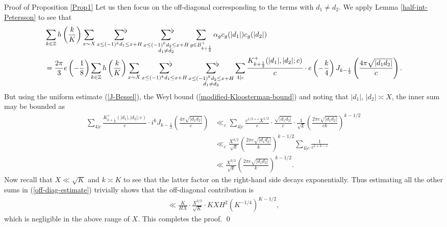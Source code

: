 \documentclass[a4paper,10pt,twoside]{amsart}
\theoremstyle{definition}
\numberwithin{equation}{section}
\newcommand\eps{\varepsilon}
\renewcommand\:{\colon}
\newcommand{\sumflat}{\mathop{{\sum}^{\raisebox{-3pt}{\makebox[0pt][l]{$\flat$}}}}}
\begin{document}
\begin{subsection}{Proof of Proposition \ref{Prop1}}
Let us then focus on the off-diagonal corresponding to the terms with $d_1\neq d_2$. We apply Lemma \ref{half-int-Petersson} to see that 
\begin{align}\label{off-diag-estimate}
&\sum_{k\in\mathbb Z}h\left(\frac{k}K\right)\sum_{x\sim X}\sumflat_{x\leq(-1)^kd_1\leq x+H}\sumflat_{\substack{x\leq(-1)^kd_2\leq x+H\\
d_1\neq d_2}}\sum_{g\in B^+_{k+\frac12}}\alpha_g c_g(|d_1|)c_g(|d_2|) \nonumber\\
&=\frac{2\pi}3 e\left(-\frac18\right)\sum_{k\in\mathbb Z}h\left(\frac{k}K\right)\sum_{x\sim X}\sumflat_{x\leq(-1)^kd_1\leq x+H}\sumflat_{\substack{x\leq(-1)^kd_2\leq x+H\\
d_1\neq d_2}}\sum_{4|c}\frac{K_{k+\frac12}^+(|d_1|,|d_2|;c)}c \cdot e\left(-\frac k4\right) J_{k-\frac12}\left(\frac{4\pi\sqrt{|d_1d_2|}}c\right).
\end{align}
But using the uniform estimate (\ref{J-Bessel}), the Weyl bound (\ref{modified-Kloosterman-bound}) and noting that $|d_1|$, $|d_2|\asymp X$, the inner sum may be bounded as 
\begin{align*}
\sum_{4|c}\frac{K_{k+\frac12}^+(|d_1|,|d_2|;c)}c \cdot i^{k} J_{k-\frac12}\left(\frac{4\pi\sqrt{|d_1d_2|}}c\right)&\ll_\eps \sum_{4|c}\frac{c^{1/2+\eps}X^{1/2}}c\cdot\frac{\sqrt{|d_1d_2|}}c\cdot\frac1{\sqrt k}\left(\frac{2\pi e\sqrt{|d_1d_2|}}{ck}\right)^{k-1/2}\\
&\ll_\eps\frac{X^{3/2}}{\sqrt k}\left(\frac{2\pi e\sqrt{|d_1d_2|}}{k}\right)^{k-1/2}\sum_{4|c}\frac1{c^{1+k-\eps}}\\
&\ll\frac{X^{3/2}}{\sqrt k}\left(\frac{2\pi e\sqrt{|d_1d_2|}}{k}\right)^{k-1/2} .
\end{align*}
Now recall that $X\ll\sqrt K$ and $k\asymp K$ to see that the latter factor on the right-hand side decays exponentially. Thus estimating all the other sums in (\ref{off-diag-estimate}) trivially shows that the off-diagonal contribution is    
\begin{align*} 
\ll \frac K{HX}\cdot\frac{X^{3/2}}{\sqrt K}\cdot KXH^2\left(K^{-1/4}\right)^{K-1/2},
\end{align*}
which is negligible in the above range of $X$. This completes the proof. \qed 
\end{subsection} 
\end{document}
